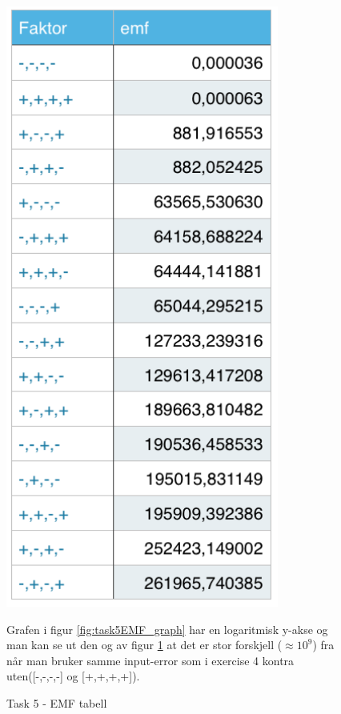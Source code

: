 	\begin{figure}[h]
		\begin{minipage}{.5\textwidth}
			\centering
			\includegraphics[width=0.8\textwidth]{sections/Exercise5/emf.png}
				\caption{Task 5 - EMF tabell}
				\label{fig:task5EMF}
		\end{minipage}
		\vspace{20 mm}
		\begin{minipage}{.5\textwidth}
			Grafen i figur \ref{fig:task5EMF_graph} har en logaritmisk y-akse og man kan se ut den og av figur \ref{fig:task5EMF} at det er stor forskjell ($\approx10^9$) fra når man bruker samme input-error som i exercise 4 kontra uten([-,-,-,-] og [+,+,+,+]).
		\end{minipage}


\end{figure}
